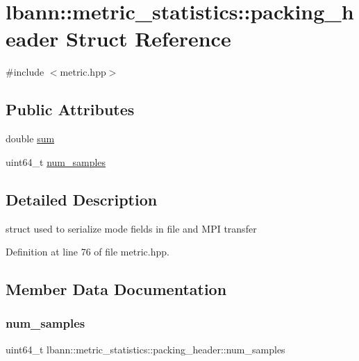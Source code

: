 \hypertarget{structlbann_1_1metric__statistics_1_1packing__header}{}\section{lbann\+:\+:metric\+\_\+statistics\+:\+:packing\+\_\+header Struct Reference}
\label{structlbann_1_1metric__statistics_1_1packing__header}


{\ttfamily \#include $<$metric.\+hpp$>$}

\subsection*{Public Attributes}
\begin{DoxyCompactItemize}
\item 
double \hyperlink{structlbann_1_1metric__statistics_1_1packing__header_a33dd5f49566506d8fc5b6662e5c5a40f}{sum}
\item 
uint64\+\_\+t \hyperlink{structlbann_1_1metric__statistics_1_1packing__header_ab580e8e40a8b894bcae9755e10dae183}{num\+\_\+samples}
\end{DoxyCompactItemize}


\subsection{Detailed Description}
struct used to serialize mode fields in file and M\+PI transfer 

Definition at line 76 of file metric.\+hpp.



\subsection{Member Data Documentation}
\mbox{\label{structlbann_1_1metric__statistics_1_1packing__header_ab580e8e40a8b894bcae9755e10dae183}} 
\subsubsection{\texorpdfstring{num\+\_\+samples}{num\_samples}}
{\footnotesize\ttfamily uint64\+\_\+t lbann\+::metric\+\_\+statistics\+::packing\+\_\+header\+::num\+\_\+samples}



